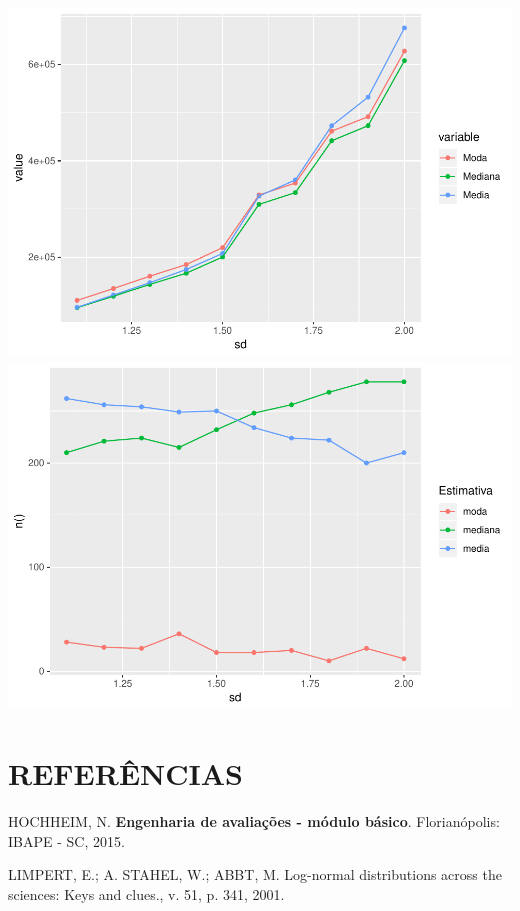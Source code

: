 \documentclass[]{article}
\begin{document}
\includegraphics{Impacto_sigma_files/figure-latex/unnamed-chunk-53-1.pdf}
\includegraphics{Impacto_sigma_files/figure-latex/unnamed-chunk-54-1.pdf}

\section*{REFERÊNCIAS}\label{referencias}

\hypertarget{refs}{}
\hypertarget{ref-hochheim}{}
HOCHHEIM, N. \textbf{Engenharia de avaliações - módulo básico}.
Florianópolis: IBAPE - SC, 2015.

\hypertarget{ref-limpert}{}
LIMPERT, E.; A. STAHEL, W.; ABBT, M. Log-normal distributions across the
sciences: Keys and clues., v. 51, p. 341, 2001.
\end{document}
